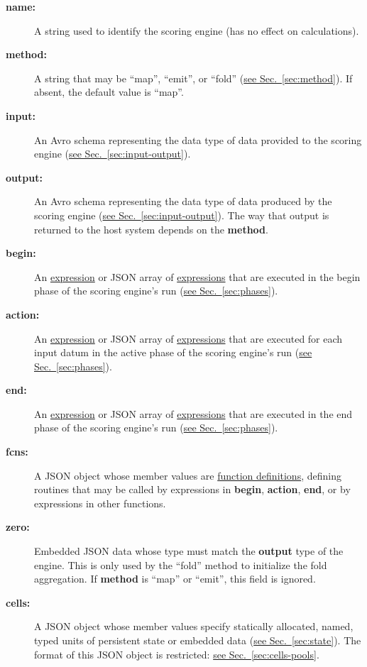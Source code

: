 \documentclass{article}
\newcommand{\PFAc}{\ttfamily\bfseries}
\newenvironment{allowedfields}%
  {\begin{center} \begin{minipage}{0.9\linewidth} \begin{description}}%
  {\end{description} \end{minipage} \end{center}}
\theoremstyle{definition}
\begin{document}
\begin{allowedfields}
\item[\PFAc name:] A string used to identify the scoring engine (has no effect on calculations).
\item[\PFAc method:] A string that may be ``map'', ``emit'', or ``fold'' (\hyperlink{hsec:method}{see Sec.~\ref{sec:method}}).  If absent, the default value is ``map''.
\item[\PFAc input:] An Avro schema representing the data type of data provided to the scoring engine (\hyperlink{hsec:input-output}{see Sec.~\ref{sec:input-output}}).
\item[\PFAc output:] An Avro schema representing the data type of data produced by the scoring engine (\hyperlink{hsec:input-output}{see Sec.~\ref{sec:input-output}}).  The way that output is returned to the host system depends on the {\PFAc method}.
\item[\PFAc begin:] An \hyperlink{hsec:expressions}{expression} or JSON array of \hyperlink{hsec:expressions}{expressions} that are executed in the begin phase of the scoring engine's run (\hyperlink{hsec:phases}{see Sec.~\ref{sec:phases}}).
\item[\PFAc action:] An \hyperlink{hsec:expressions}{expression} or JSON array of \hyperlink{hsec:expressions}{expressions} that are executed for each input datum in the active phase of the scoring engine's run (\hyperlink{hsec:phases}{see Sec.~\ref{sec:phases}}).
\item[\PFAc end:] An \hyperlink{hsec:expressions}{expression} or JSON array of \hyperlink{hsec:expressions}{expressions} that are executed in the end phase of the scoring engine's run (\hyperlink{hsec:phases}{see Sec.~\ref{sec:phases}}).
\item[\PFAc fcns:] A JSON object whose member values are \hyperlink{hsec:fcndef}{function definitions}, defining routines that may be called by expressions in {\PFAc begin}, {\PFAc action}, {\PFAc end}, or by expressions in other functions.
\item[\PFAc zero:] Embedded JSON data whose type must match the {\PFAc output} type of the engine.  This is only used by the ``fold'' method to initialize the fold aggregation.  If {\PFAc method} is ``map'' or ``emit'', this field is ignored.
\item[\PFAc cells:] A JSON object whose member values specify statically allocated, named, typed units of persistent state or embedded data (\hyperlink{hsec:state}{see Sec.~\ref{sec:state}}).  The format of this JSON object is restricted: \hyperlink{hsec:cells-pools}{see Sec.~\ref{sec:cells-pools}}.

\end{allowedfields}
\end{document}
